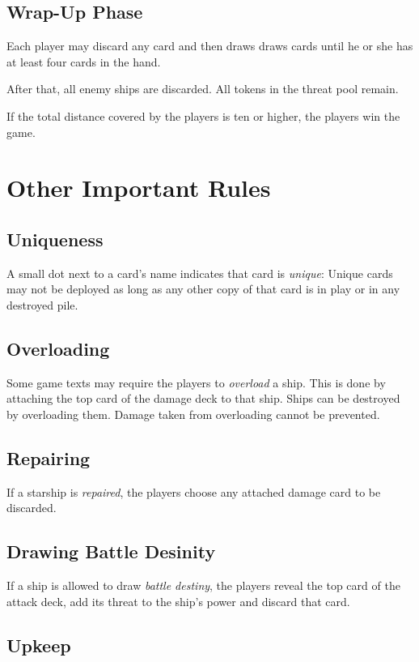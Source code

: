\documentclass[11pt, a4paper]{article}
\begin{document}
\subsection{Wrap-Up Phase}

Each player may discard any card and then draws draws cards until he or she has
at least four cards in the hand.

After that, all enemy ships are discarded. All tokens in the threat pool remain.

If the total distance covered by the players is ten or higher, the players win
the game.

\section{Other Important Rules}
\subsection{Uniqueness}

A small dot next to a card's name indicates that card is \emph{unique}: Unique
cards may not be deployed as long as any other copy of that card is in play or
in any destroyed pile.

\subsection{Overloading}

Some game texts may require the players to \emph{overload} a ship. This is done
by attaching the top card of the damage deck to that ship. Ships can be
destroyed by overloading them. Damage taken from overloading cannot be
prevented.

\subsection{Repairing}

If a starship is \emph{repaired}, the players choose any attached damage
card to be discarded.

\subsection{Drawing Battle Desinity}

If a ship is allowed to draw \emph{battle destiny}, the players reveal the top
card of the attack deck, add its threat to the ship's power and discard that
card.

\subsection{Upkeep}
\label{upkeep}
\end{document}
